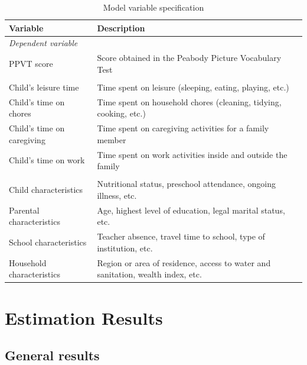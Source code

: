 \documentclass[12pt]{article}
\begin{document}
\begin{table}[ht]
\centering
\caption{Model variable specification}
\label{tab:modelvars}
\begin{tabular}{lp{9cm}}
\toprule
\textbf{Variable} & \textbf{Description} \\
\midrule
\multicolumn{2}{l}{\textit{Dependent variable}} \\
PPVT score & Score obtained in the Peabody Picture Vocabulary Test \\
\addlinespace
\multicolumn{2}{l}{\textit{Main independent variables}} \\
Child's leisure time       & Time spent on leisure (sleeping, eating, playing, etc.) \\
Child's time on chores     & Time spent on household chores (cleaning, tidying, cooking, etc.) \\
Child's time on caregiving & Time spent on caregiving activities for a family member \\
Child's time on work       & Time spent on work activities inside and outside the family \\
\addlinespace
\multicolumn{2}{l}{\textit{Additional controls}} \\
Child characteristics      & Nutritional status, preschool attendance, ongoing illness, etc. \\
Parental characteristics   & Age, highest level of education, legal marital status, etc. \\
School characteristics     & Teacher absence, travel time to school, type of institution, etc. \\
Household characteristics  & Region or area of residence, access to water and sanitation, wealth index, etc. \\
\bottomrule
\end{tabular}
\end{table}

\section{Estimation Results}
\label{sec:results}

\subsection{General results}
\label{subsec:general}
\end{document}
